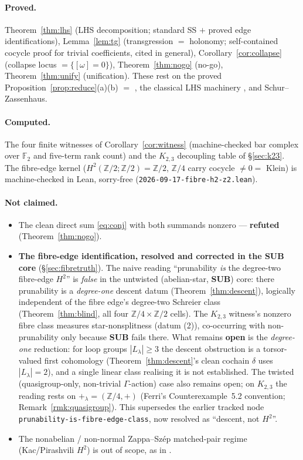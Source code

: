 \documentclass[11pt]{article}
\theoremstyle{definition}
\newcommand{\Z}{\mathbb{Z}}
\begin{document}
\paragraph{Proved.} Theorem~\ref{thm:lhs} (LHS decomposition; standard SS $+$ proved edge
identifications), Lemma~\ref{lem:tg} (transgression $=$ holonomy; self-contained cocycle
proof for trivial coefficients, cited \cite{nsw} in general), Corollary~\ref{cor:collapse}
(collapse locus $=\{[\omega]=0\}$), Theorem~\ref{thm:nogo} (no-go), Theorem~\ref{thm:unify}
(unification). These rest on the proved Proposition~\ref{prop:reduce}(a)(b)
$=$ \cite{gzs,sep2}, the classical LHS machinery \cite{weibel,nsw}, and Schur--Zassenhaus.
\paragraph{Computed.} The four finite witnesses of Corollary~\ref{cor:witness}
(machine-checked bar complex over $\mathbb F_2$ and five-term rank count) and the $K_{2,3}$
decoupling table of \S\ref{sec:k23}. The fibre-edge kernel ($H^2(\Z/2;\Z/2)=\Z/2$, $\Z/4$
carry cocycle $\neq0=$ Klein) is machine-checked in Lean, sorry-free
(\texttt{2026-09-17-}\allowbreak\texttt{fibre-h2-z2.lean}).
\paragraph{Not claimed.}
\begin{itemize}
\item The clean direct sum \eqref{eq:conj} with both summands nonzero --- \textbf{refuted}
(Theorem~\ref{thm:nogo}).
\item \textbf{The fibre-edge identification, resolved and corrected in the SUB core}
(\S\ref{sec:fibretruth}). The naive reading ``prunability \emph{is} the degree-two fibre-edge
$H^2$'' is \emph{false} in the untwisted (abelian-star, \textbf{SUB}) core: there prunability is a
\emph{degree-one} descent datum (Theorem~\ref{thm:descent}), logically independent of the fibre
edge's degree-two Schreier class (Theorem~\ref{thm:blind}, all four $\Z/4\times\Z/2$ cells). The
$K_{2,3}$ witness's nonzero fibre class measures star-nonsplitness (datum (2)), co-occurring with
non-prunability only because \textbf{SUB} fails there. What remains \textbf{open} is the
\emph{degree-one} reduction: for loop groups $|L_\lambda|\ge3$ the descent obstruction is a
torsor-valued first cohomology (Theorem~\ref{thm:descent}'s clean cochain $\delta$ uses
$|L_\lambda|=2$), and a single linear class realising it is not established. The twisted
(quasigroup-only, non-trivial $\Gamma$-action) case also remains open; on $K_{2,3}$ the reading
rests on $+_\lambda=(\Z/4,+)$ (Ferri's Counterexample~5.2 convention;
Remark~\ref{rmk:quasigroup}). This supersedes the earlier tracked node
\texttt{prunability-is-fibre-edge-class}, now resolved as ``descent, not $H^2$''.
\item The nonabelian / non-normal Zappa--Sz\'ep matched-pair regime (Kac/Pirashvili $H^2$) is
out of scope, as in \cite{gzs}.
\end{itemize}
\end{document}
